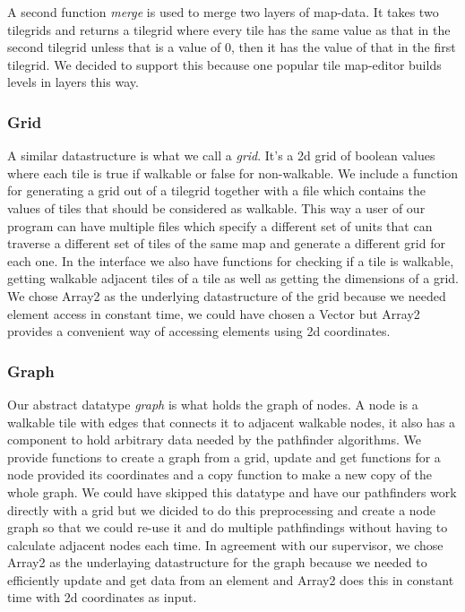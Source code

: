 \documentclass[12pt, a4paper]{article}
\begin{document}
A second function \textit{merge} is used to merge two layers of map-data. It takes two tilegrids and returns a tilegrid where every tile has the same value as that in the second tilegrid unless that is a value of 0, then it has the value of that in the first tilegrid. We decided to support this because one popular tile map-editor\cite{mapeditor} builds levels in layers this way.

\subsubsection{Grid}

A similar datastructure is what we call a \textit{grid}. It's a 2d grid of boolean values where each tile is true if walkable or false for non-walkable. We include a function for generating a grid out of a tilegrid together with a file which contains the values of tiles that should be considered as walkable. This way a user of our program can have multiple files which specify a different set of units that can traverse a different set of tiles of the same map and generate a different grid for each one. In the interface we also have functions for checking if a tile is walkable, getting walkable adjacent tiles of a tile as well as getting the dimensions of a grid. We chose Array2 as the underlying datastructure of the grid because we needed element access in constant time, we could have chosen a Vector but Array2 provides a convenient way of accessing elements using 2d coordinates. 

\subsubsection{Graph}
Our abstract datatype \textit{graph} is what holds the graph of nodes. A node is a walkable tile with edges that connects it to adjacent walkable nodes, it also has a component to hold arbitrary data needed by the pathfinder algorithms. We provide functions to create a graph from a grid, update and get functions for a node provided its coordinates and a copy function to make a new copy of the whole graph. We could have skipped this datatype and have our pathfinders work directly with a grid but we dicided to do this preprocessing and create a node graph so that we could re-use it and do multiple pathfindings without having to calculate adjacent nodes each time. In agreement with our supervisor, we chose Array2 as the underlaying datastructure for the graph because we needed to efficiently update and get data from an element and Array2 does this in constant time with 2d coordinates as input.
\end{document}
